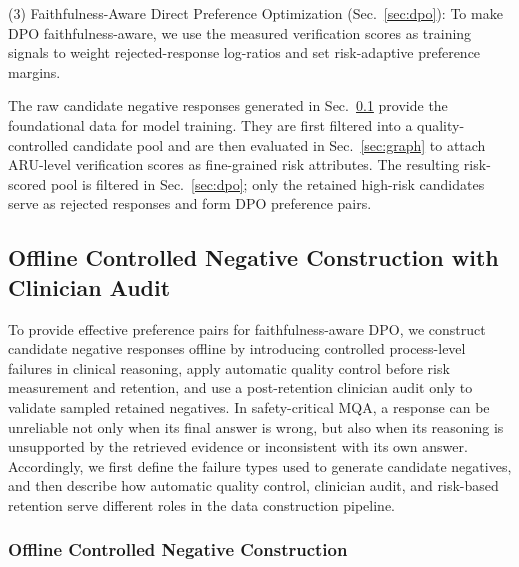 \documentclass[a4paper,fleqn,doubleblind]{cas-sc}
\begin{document}
(3) Faithfulness-Aware Direct Preference Optimization (Sec.~\ref{sec:dpo}):
To make DPO faithfulness-aware, we use the measured verification scores as training signals to weight rejected-response log-ratios and set risk-adaptive preference margins.


The raw candidate negative responses generated in Sec.~\ref{sec:cot} provide the foundational data for model training.
They are first filtered into a quality-controlled candidate pool and are then evaluated in Sec.~\ref{sec:graph} to attach ARU-level verification scores as fine-grained risk attributes.
The resulting risk-scored pool is filtered in Sec.~\ref{sec:dpo}; only the retained high-risk candidates serve as rejected responses and form DPO preference pairs.


\subsection{Offline Controlled Negative Construction with Clinician Audit}
\label{sec:cot}
To provide effective preference pairs for faithfulness-aware DPO, we construct candidate negative responses offline by introducing controlled process-level failures in clinical reasoning, apply automatic quality control before risk measurement and retention, and use a post-retention clinician audit only to validate sampled retained negatives.
In safety-critical MQA, a response can be unreliable not only when its final answer is wrong, but also when its reasoning is unsupported by the retrieved evidence or inconsistent with its own answer.
Accordingly, we first define the failure types used to generate candidate negatives, and then describe how automatic quality control, clinician audit, and risk-based retention serve different roles in the data construction pipeline.
\subsubsection{Offline Controlled Negative Construction}
\end{document}
